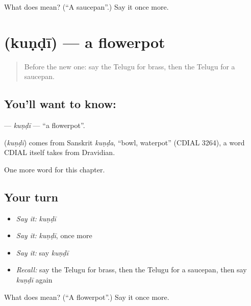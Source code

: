 \begin{tcolorbox}[breakable,colback=teal!4,colframe=teal!35!black,title={Before you move on}]
What does  mean? (\textquotedblleft{}A saucepan\textquotedblright{}.) Say it once more.
\end{tcolorbox}
\section[\texorpdfstring{\te{కుండీ} (kuṇḍī)}{కుండీ (kuṇḍī)}]{ (kuṇḍī) — a flowerpot}

\label{lesson:TE-C270-kundi}



\begin{quote}
Before the new one: say the Telugu for brass, then the Telugu for a saucepan.
\end{quote}

\subsection*{You'll want to know: }
\textbf{} — \emph{kuṇḍī} — \textquotedblleft{}a flowerpot\textquotedblright{}.

\begin{cousinweb}
\textbf{} (\emph{kuṇḍī}) comes from Sanskrit \emph{kuṇḍa}, \textquotedblleft{}bowl, waterpot\textquotedblright{} (CDIAL 3264), a word CDIAL itself takes from Dravidian.
\end{cousinweb}

\begin{grammarlens}[title={What you've built}]
One more word for this chapter.
\end{grammarlens}

\subsection*{Your turn}
\begin{itemize}
\raggedright
  \item \emph{Say it:} \emph{kuṇḍī}
  \item \emph{Say it:} \emph{kuṇḍī}, once more
  \item \emph{Say it:} say \emph{kuṇḍī}
  \item \emph{Recall:} say the Telugu for brass, then the Telugu for a saucepan, then say \emph{kuṇḍī} again
\end{itemize}

\begin{tcolorbox}[breakable,colback=teal!4,colframe=teal!35!black,title={Before you move on}]
What does  mean? (\textquotedblleft{}A flowerpot\textquotedblright{}.) Say it once more.
\end{tcolorbox}
